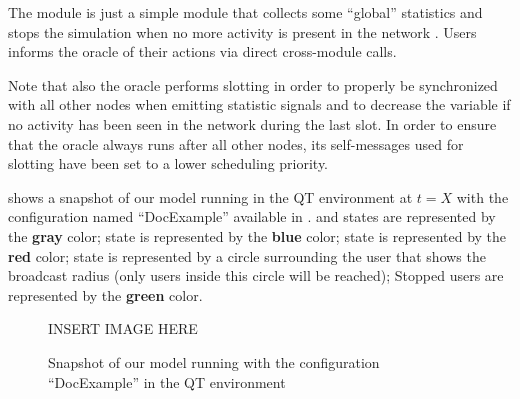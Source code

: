 The  module is just a simple module that collects some ``global''
statistics and stops the simulation when no more activity is present in the
network . Users informs the oracle of
their actions via direct cross-module calls.

Note that also the oracle performs slotting in order to properly be synchronized
with all other nodes when emitting statistic signals and to decrease the
 variable if no activity has been seen in the network during the
last slot. In order to ensure that the oracle always runs after all other nodes,
its self-messages used for slotting have been set to a lower scheduling
priority.

 shows a snapshot of our model running in the \omnetpp{} QT
environment at \(t = X\) with the configuration named ``DocExample'' available
in .  and  states are
represented by the \textcolor{idle}{\textbf{gray}} color;  state
is represented by the \textcolor{hearing}{\textbf{blue}} color; 
state is represented by the \textcolor{collision}{\textbf{red}} color;
 state is represented by a circle surrounding the user that shows
the broadcast radius (only users inside this circle will be reached); Stopped
users are represented by the \textcolor{relayed}{\textbf{green}} color.

\begin{figure}[htb]
	\centering
	INSERT IMAGE HERE
	\caption{Snapshot of our model running with the configuration
	``DocExample'' in the \omnetpp{} QT environment}\label{fig:snapshot}
\end{figure}
